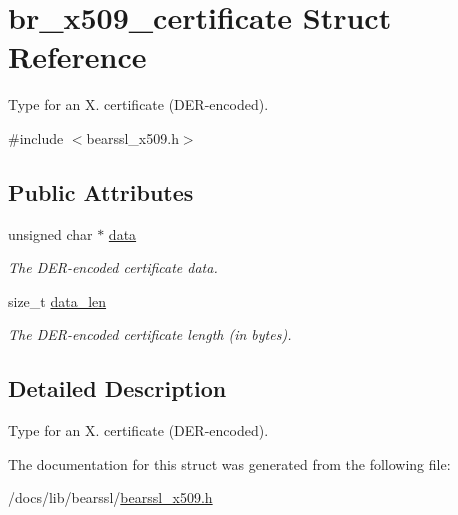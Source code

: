 \hypertarget{structbr__x509__certificate}{}\section{br\+\_\+x509\+\_\+certificate Struct Reference}
\label{structbr__x509__certificate}


Type for an X. certificate (D\+E\+R-\/encoded).  




{\ttfamily \#include $<$bearssl\+\_\+x509.\+h$>$}

\subsection*{Public Attributes}
\begin{DoxyCompactItemize}
\item 
\mbox{\label{structbr__x509__certificate_a05ee770fbbc9ab1bbe4e932af3f3a22e}} 
unsigned char $\ast$ \hyperlink{structbr__x509__certificate_a05ee770fbbc9ab1bbe4e932af3f3a22e}{data}
\begin{DoxyCompactList}\small\item\em The D\+E\+R-\/encoded certificate data. \end{DoxyCompactList}\item 
\mbox{\label{structbr__x509__certificate_aef9b6a9e5470288040f251b892fa1b4f}} 
size\+\_\+t \hyperlink{structbr__x509__certificate_aef9b6a9e5470288040f251b892fa1b4f}{data\+\_\+len}
\begin{DoxyCompactList}\small\item\em The D\+E\+R-\/encoded certificate length (in bytes). \end{DoxyCompactList}\end{DoxyCompactItemize}


\subsection{Detailed Description}
Type for an X. certificate (D\+E\+R-\/encoded). 

The documentation for this struct was generated from the following file\+:\begin{DoxyCompactItemize}
\item 
/docs/lib/bearssl/\hyperlink{bearssl__x509_8h}{bearssl\+\_\+x509.\+h}\end{DoxyCompactItemize}
